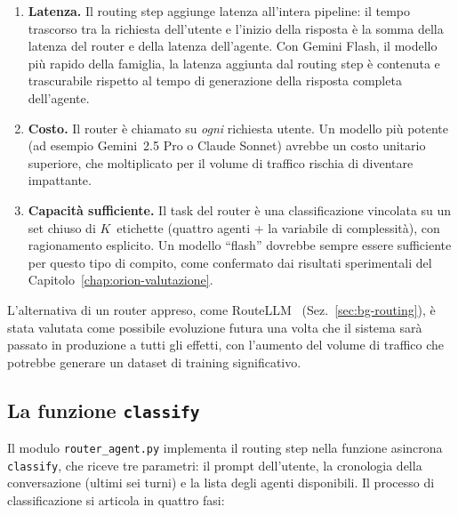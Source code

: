 \begin{enumerate}
  \item \textbf{Latenza.} Il routing step aggiunge latenza all'intera pipeline:
  il tempo trascorso tra la richiesta dell'utente e l'inizio della risposta è la somma della latenza del router e della latenza dell'agente.
  Con Gemini Flash, il modello più rapido della famiglia, la latenza aggiunta dal routing step è contenuta e trascurabile rispetto al tempo di generazione della risposta completa dell'agente.
  \item \textbf{Costo.} Il router è chiamato su \emph{ogni} richiesta utente. Un modello più potente (ad esempio Gemini~2.5 Pro o Claude Sonnet) avrebbe un costo unitario superiore,
  che moltiplicato per il volume di traffico rischia di diventare impattante.
  \item \textbf{Capacità sufficiente.} Il task del router è una classificazione
  vincolata su un set chiuso di $K$~etichette (quattro agenti + la variabile di complessità), con ragionamento esplicito.
  Un modello ``flash'' dovrebbe sempre essere sufficiente per questo tipo di compito,
  come confermato dai risultati sperimentali del Capitolo~\ref{chap:orion-valutazione}.
\end{enumerate}

L'alternativa di un router appreso, come RouteLLM~\cite{ong2024routellm} (Sez.~\ref{sec:bg-routing}),
è stata valutata come possibile evoluzione futura una volta che il sistema
sarà passato in produzione a tutti gli effetti, con l'aumento del volume di traffico
che potrebbe generare un dataset di training significativo.

\subsection{La funzione \texttt{classify}}
\label{subsec:orion-impl-router}

Il modulo \texttt{router\_agent.py} implementa il routing step nella funzione
asincrona \texttt{classify}, che riceve tre parametri: il prompt dell'utente,
la cronologia della conversazione (ultimi sei turni) e la lista degli agenti
disponibili. Il processo di classificazione si articola in quattro fasi:

